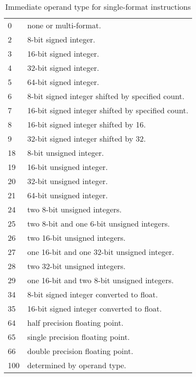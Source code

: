 \documentclass[forwardcom.tex]{subfiles}
\begin{document}
\begin{longtable} {|p{18mm}|p{100mm}|}
\caption{
Immediate operand type for single-format instructions} 
\label{table:immediateOperantTypesInInstructionList}
\\
\endfirsthead
\endhead
\hline
0 & none or multi-format. \\
2 & 8-bit signed integer. \\
3 & 16-bit signed integer. \\
4 & 32-bit signed integer. \\
5 & 64-bit signed integer. \\
6 & 8-bit signed integer shifted by specified count. \\
7 & 16-bit signed integer shifted by specified count. \\
8 & 16-bit signed integer shifted by 16. \\
9 & 32-bit signed integer shifted by 32. \\
18 & 8-bit unsigned integer. \\
19 & 16-bit unsigned integer. \\
20 & 32-bit unsigned integer. \\
21 & 64-bit unsigned integer. \\
24 & two 8-bit unsigned integers. \\
25 & two 8-bit and one 6-bit unsigned integers. \\
26 & two 16-bit unsigned integers. \\
27 & one 16-bit and one 32-bit unsigned integer. \\
28 & two 32-bit unsigned integers. \\
29 & one 16-bit and two 8-bit unsigned integers. \\
34 & 8-bit signed integer converted to float. \\
35 & 16-bit signed integer converted to float. \\
64 & half precision floating point. \\
65 & single precision floating point. \\
66 & double precision floating point. \\
100 & determined by operand type. \\
\hline
\end{longtable}
\end{document}
